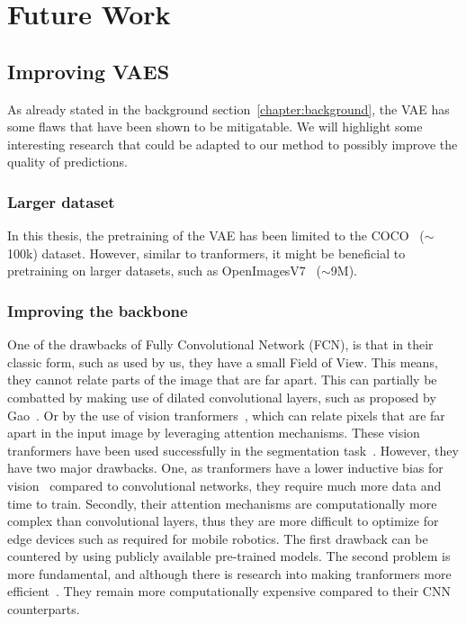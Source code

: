 \chapter{Future Work}\label{chapter:future_work}

\section{Improving VAES}
As already stated in the background section~\ref{chapter:background}, the VAE has some flaws that have been shown to be mitigatable. We will highlight some interesting research that could be adapted to our method to possibly improve the quality of predictions.
\subsection{Larger dataset}
In this thesis, the pretraining of the VAE has been limited to the COCO~\cite{lin2015microsoftcococommonobjects} ($\sim$100k) dataset. However, similar to tranformers, it might be beneficial to pretraining on larger datasets, such as OpenImagesV7~\cite{OpenImages} ($\sim$9M).

\subsection{Improving the backbone}
One of the drawbacks of Fully Convolutional Network (FCN), is that in their classic form, such as used by us, they have a small Field of View. This means, they cannot relate parts of the image that are far apart. This can partially be combatted by making use of dilated convolutional layers, such as proposed by Gao~\cite{gao2023rethinking}. Or by the use of vision tranformers~\cite{dosovitskiy2021image}, which can relate pixels that are far apart in the input image by leveraging attention mechanisms. These vision tranformers have been used successfully in the segmentation task~\cite{xie2021segformer,chen2022vision}. However, they have two major drawbacks. One, as tranformers have a lower inductive bias for vision~\cite{dosovitskiy2021image} compared to convolutional networks, they require much more data and time to train. Secondly, their attention mechanisms are computationally more complex than convolutional layers, thus they are more difficult to optimize for edge devices such as required for mobile robotics. The first drawback can be countered by using publicly available pre-trained models. The second problem is more fundamental, and although there is research into making tranformers more efficient~\cite{li2022efficientformer,Yu2021MetaFormerIA}. They remain more computationally expensive compared to their CNN counterparts.

